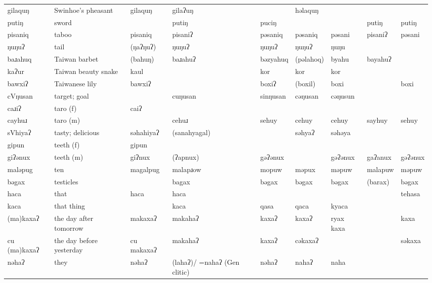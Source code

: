 \begin{landscape}
\begin{longtable}{*{9}{>{\raggedright\arraybackslash}p{}}}
\text{*}gilaquŋ      & Swinhoe's pheasant & gilaquŋ & gilaʔuŋ &  & həlaquŋ &  &  & \\
\text{*}putiŋ        & sword &  & putiŋ & puciŋ &  &  & putiŋ & putiŋ\\
\text{*}pisaniq      & taboo & pisaniq & pisaniʔ & pəsaniq & pəsaniq & pəsani & pisaniʔ & pəsani\\
\text{*}ŋuŋuʔ        & tail & (ŋaʔŋuʔ) & ŋuŋuʔ & ŋuŋuʔ & ŋuŋuʔ & ŋuŋu &  & \\
\text{*}baɹahuq      & Taiwan barbet & (bahuŋ) & baɹahuʔ & bəzyahuq & (pəlahoq) & byahu & bayahuʔ & \\
\text{*}kaʔur        & Taiwan beauty snake & kaul &  & kor & kor & kor &  & \\
\text{*}bawxiʔ       & Taiwanese lily & bawxiʔ &  & boxiʔ & (boxil) & boxi &  & boxi\\
\text{*}cVŋusan      & target; goal &  & cuŋusan & sinŋusan & cəŋusan & cəŋusun &  & \\
\text{*}caɹiʔ        & taro (f) & caiʔ &  &  &  &  &  & \\
\text{*}cayhuɹ       & taro (m) &  & cehuɹ & sehuy & cehuy & cehuy & sayhuy & sehuy\\
\text{*}sVhiyaʔ      & tasty; delicious & səhahiyaʔ & (sanahyagal) &  & səhyaʔ & səhəya &  & \\
\text{*}gipun        & teeth (f) & gipun &  &  &  &  &  & \\
\text{*}giʔənux      & teeth (m) & giʔnux & (ʔapnux) & gəʔənux &  & gəʔənux & gaʔanux & gəʔənux\\
\text{*}maləpug      & ten & magalpug & malapɹow & mopuw & məpux & məpuw & malapuw & məpuw\\
\text{*}bəgax        & testicles &  & bagax & bəgax & bəgax & bəgax & (barax) & bəgax\\
\text{*}haca         & that & haca & haca &  &  &  &  & tehasa\\
\text{*}kaca         & that thing &  & kaca & qasa & qaca & kyaca &  & \\
\text{*}(ma)kaxaʔ    & the day after tomorrow & makaxaʔ & makahaʔ & kaxaʔ & kaxaʔ & ryax kaxa &  & kaxa\\
\text{*}cu (ma)kaxaʔ & the day before yesterday & cu makaxaʔ & makahaʔ & kaxaʔ & cəkaxaʔ &  &  & səkaxa\\
\text{*}nəhaʔ        & they & nəhaʔ & (lahaʔ)/ \newline =nahaʔ \newline (Gen clitic) & nəhaʔ & nahaʔ & naha &  & \\

\end{longtable}
\end{landscape}
